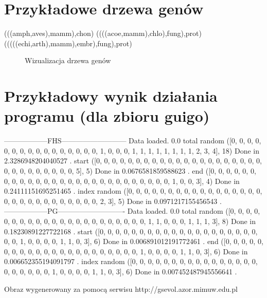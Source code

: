 \documentclass[licencjacka]{pracamgr}
\begin{document}
\chapter{Przykładowe drzewa genów}

{\obeylines %
(((amph,aves),mamm),chon)
((((acoe,mamm),chlo),fung),prot)
(((((echi,arth),mamm),embr),fung),prot)
}

\begin{figure}[tp]
  \centering
  \caption{Wizualizacja drzewa genów}
\end{figure}



\chapter{Przykładowy wynik działania programu
    (dla zbioru guigo)}

{\obeylines %
------------------FHS---------------------------
Data loaded. 0.0%
total random
([0, 0, 0, 0, 0, 0, 0, 0, 0, 0, 0, 0, 0, 0, 0, 0, 1, 0, 0, 0, 1, 1, 1, 1, 1, 1, 1, 1, 2, 3, 4], 18)
Done in 2.3286948204040527 .
start
([0, 0, 0, 0, 0, 0, 0, 0, 0, 0, 0, 0, 0, 0, 0, 0, 0, 0, 0, 0, 0, 0, 0, 0, 0, 0, 0, 0, 0, 0, 5], 5)
Done in 0.0676581859588623 .
end
([0, 0, 0, 0, 0, 0, 0, 0, 0, 0, 0, 0, 0, 0, 0, 0, 0, 0, 0, 0, 0, 0, 0, 0, 0, 0, 0, 1, 0, 0, 3], 4)
Done in 0.24111151695251465 .
index random
([0, 0, 0, 0, 0, 0, 0, 0, 0, 0, 0, 0, 0, 0, 0, 0, 0, 0, 0, 0, 0, 0, 0, 0, 0, 0, 0, 0, 0, 2, 3], 5)
Done in 0.0971217155456543 .
------------------PG----------------------------
Data loaded. 0.0%
total random
([0, 0, 0, 0, 0, 0, 0, 0, 0, 0, 0, 0, 0, 0, 0, 0, 0, 0, 0, 0, 0, 0, 1, 1, 0, 0, 0, 1, 1, 1, 3], 8)
Done in 0.18230891227722168 .
start
([0, 0, 0, 0, 0, 0, 0, 0, 0, 0, 0, 0, 0, 0, 0, 0, 0, 0, 0, 0, 0, 0, 1, 0, 0, 0, 0, 1, 1, 0, 3], 6)
Done in 0.006891012191772461 .
end
([0, 0, 0, 0, 0, 0, 0, 0, 0, 0, 0, 0, 0, 0, 0, 0, 0, 0, 0, 0, 0, 0, 1, 0, 0, 0, 0, 1, 1, 0, 3], 6)
Done in 0.006652355194091797 .
index random
([0, 0, 0, 0, 0, 0, 0, 0, 0, 0, 0, 0, 0, 0, 0, 0, 0, 0, 0, 0, 0, 0, 1, 0, 0, 0, 0, 1, 1, 0, 3], 6)
Done in 0.007452487945556641 .
}

\begin{thebibliography}{99}


 Obraz wygenerowany za pomocą serwisu http://gsevol.azor.mimuw.edu.pl 

\end{thebibliography}
\end{document}
